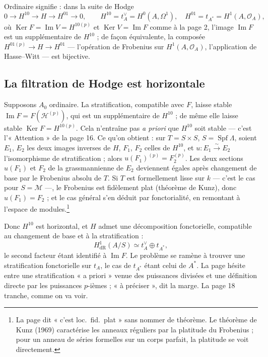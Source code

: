 \documentclass[11pt,a4paper]{article}
\begin{document}
Ordinaire signifie : dans la suite de Hodge
\[
0 \to H^{10} \to H \to H^{01} \to 0 , \qquad H^{10} = t_{A}^\vee =
H^0(A, \Omega^1), \quad H^{01} = t_{A^*} = H^1(A, \mathcal{O}_A) ,
\]
où $\operatorname{Ker} F = \operatorname{Im} V = H^{10(p)}$ et
$\operatorname{Ker} V = \operatorname{Im} F$ comme à la page 2, l'image $\operatorname{Im} F$ est un
supplémentaire de $H^{10}$ ; de façon équivalente, la composée $H^{01(p)} \to
H \to H^{01}$ --- l'opération de Frobenius sur $H^1(A, \mathcal{O}_A)$,
l'application de Hasse--Witt --- est bijective.

\subsection*{La filtration de Hodge est horizontale}

Supposons $A_0$ ordinaire. La stratification, compatible avec $F$, laisse
stable $\operatorname{Im} F = F(\mathcal{H}^{(p)})$, qui est un supplémentaire
de $H^{10}$ ; de même elle laisse stable $\operatorname{Ker} F = H^{10(p)}$.
Cela n'entraîne pas \emph{a priori} que $H^{10}$ soit stable --- c'est
l'« Attention » de la page 16. Ce qu'on obtient : sur $T = S \times S$, $S =
\operatorname{Spf}\Lambda$, soient $E_1$, $E_2$ les deux images inverses de
$H$, $F_1$, $F_2$ celles de $H^{10}$, et $u : E_1 \xrightarrow{\sim} E_2$
l'isomorphisme de stratification ; alors $u(F_1)^{(p)} = F_2^{(p)}$. Les deux
sections $u(F_1)$ et $F_2$ de la grassmannienne de $E_2$ deviennent égales
après changement de base par le Frobenius absolu de $T$. Si $T$ est
formellement lisse sur $k$ --- c'est le cas pour $S = \mathcal{M}$ ---, le
Frobenius est fidèlement plat (théorème de Kunz), donc $u(F_1) = F_2$ ; et le
cas général s'en déduit par fonctorialité, en remontant à l'espace de
modules.\footnote{La page dit « c'est loc.\ fid.\ plat » sans nommer de
théorème. Le théorème de Kunz (1969) caractérise les anneaux réguliers par la
platitude du Frobenius ; pour un anneau de séries formelles sur un corps
parfait, la platitude se voit directement.}

Donc $H^{10}$ est horizontal, et $H$ admet une décomposition fonctorielle,
compatible au changement de base et à la stratification :
\[
H^1_{\mathrm{dR}}(A/S) \simeq t_A^\vee \oplus t_{A^*} ,
\]
le second facteur étant identifié à $\operatorname{Im} F$. Le problème se
ramène à trouver une stratification fonctorielle sur $t_A$, le cas de
$t_{A^*}$ étant celui de $A^*$. La page hésite entre une stratification
« a priori » venue des puissances divisées et une définition directe par les
puissances $p$-ièmes ; « à préciser », dit la marge. La page 18 tranche,
comme on va voir.
\end{document}
